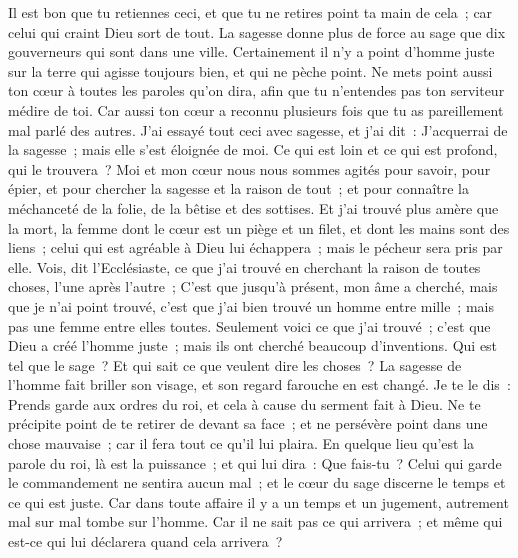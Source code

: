 \begin{multicols}{2}
Il est bon que tu retiennes ceci, et que tu ne retires point ta main de cela~; car celui qui craint Dieu sort de tout.
La sagesse donne plus de force au sage que dix gouverneurs qui sont dans une ville.
Certainement il n'y a point d'homme juste sur la terre qui agisse toujours bien, et qui ne pèche point.
Ne mets point aussi ton cœur à toutes les paroles qu'on dira, afin que tu n'entendes pas ton serviteur médire de toi. 
Car aussi ton cœur a reconnu plusieurs fois que tu as pareillement mal parlé des autres. 
J'ai essayé tout ceci avec sagesse, et j'ai dit~: J'acquerrai de la sagesse~; mais elle s'est éloignée de moi. 
Ce qui est loin et ce qui est profond, qui le trouvera~?
Moi et mon cœur nous nous sommes agités pour savoir, pour épier, et pour chercher la sagesse et la raison de tout~; et pour connaître la méchanceté de la folie, de la bêtise et des sottises. 
Et j'ai trouvé plus amère que la mort, la femme dont le cœur est un piège et un filet, et dont les mains sont des liens~; celui qui est agréable à Dieu lui échappera~; mais le pécheur sera pris par elle.
Vois, dit l'Ecclésiaste, ce que j'ai trouvé en cherchant la raison de toutes choses, l'une après l'autre~;
C'est que jusqu'à présent, mon âme a cherché, mais que je n'ai point trouvé, c'est que j'ai bien trouvé un homme entre mille~; mais pas une femme entre elles toutes. 
Seulement voici ce que j'ai trouvé~; c'est que Dieu a créé l'homme juste~; mais ils ont cherché beaucoup d'inventions.
\VerseOne{}Qui est tel que le sage~? Et qui sait ce que veulent dire les choses~? La sagesse de l'homme fait briller son visage, et son regard farouche en est changé.
Je te le dis~: Prends garde aux ordres du roi, et cela à cause du serment fait à Dieu.
Ne te précipite point de te retirer de devant sa face~; et ne persévère point dans une chose mauvaise~; car il fera tout ce qu'il lui plaira. 
En quelque lieu qu'est la parole du roi, là est la puissance~; et qui lui dira~: Que fais-tu~? 
Celui qui garde le commandement ne sentira aucun mal~; et le cœur du sage discerne le temps et ce qui est juste. 
Car dans toute affaire il y a un temps et un jugement, autrement mal sur mal tombe sur l'homme. 
Car il ne sait pas ce qui arrivera~; et même qui est-ce qui lui déclarera quand cela arrivera~? 

\end{multicols}
